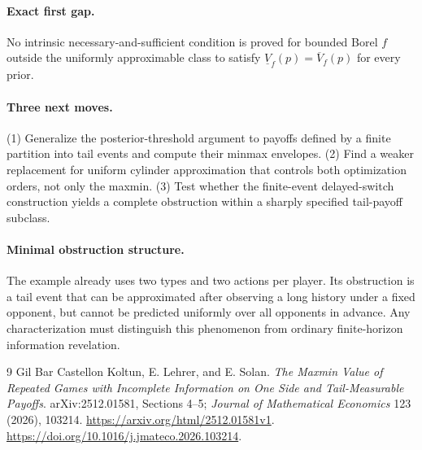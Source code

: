 \documentclass[11pt,a4paper]{article}
\theoremstyle{definition}
\theoremstyle{remark}
\begin{document}
\paragraph{Exact first gap.}
No intrinsic necessary-and-sufficient condition is proved for bounded Borel $f$ outside the uniformly approximable class to satisfy $\underline V_f(p)=\overline V_f(p)$ for every prior.

\paragraph{Three next moves.}
(1) Generalize the posterior-threshold argument to payoffs defined by a finite partition into tail events and compute their minmax envelopes. (2) Find a weaker replacement for uniform cylinder approximation that controls both optimization orders, not only the maxmin. (3) Test whether the finite-event delayed-switch construction yields a complete obstruction within a sharply specified tail-payoff subclass.

\paragraph{Minimal obstruction structure.}
The example already uses two types and two actions per player. Its obstruction is a tail event that can be approximated after observing a long history under a fixed opponent, but cannot be predicted uniformly over all opponents in advance. Any characterization must distinguish this phenomenon from ordinary finite-horizon information revelation.

\begin{thebibliography}{9}
 Gil Bar Castellon Koltun, E. Lehrer, and E. Solan. \emph{The Maxmin Value of Repeated Games with Incomplete Information on One Side and Tail-Measurable Payoffs}. arXiv:2512.01581, Sections 4--5; \emph{Journal of Mathematical Economics} 123 (2026), 103214. \url{https://arxiv.org/html/2512.01581v1}. \url{https://doi.org/10.1016/j.jmateco.2026.103214}.
\end{thebibliography}
\end{document}
